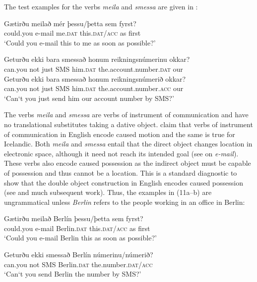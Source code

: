 \documentclass[output=paper,modfonts,nonflat,colorlinks,citecolor=brown]{langsci/langscibook}
\begin{document}
The test examples for the verbs \textit{meila} and \textit{smessa} are given in :

\ea%
    \label{ex:jonsson:10}
\ea
\gll  Gætirðu  meilað  mér  þessu/þetta  sem  fyrst?\\
   could.you  e-mail  me.\textsc{dat}  this.\textsc{dat/acc}  as  first\\
\glt `Could you e-mail this to me as soon as possible?'

\ex
\gll   Geturðu  ekki  bara  smessað  honum  reikningsnúmerinu  okkar?\\
 can.you  not  just  SMS  him.\textsc{dat}  the.account.number.\textsc{dat}  our\\


\ex
\gll   Geturðu  ekki  bara  smessað  honum  reikningsnúmerið  okkar?\\
 can.you  not  just  SMS  him.\textsc{dat}  the.account.number.\textsc{acc}  our\\
\glt `Can‘t you just send him our account number by SMS?'
\z
\z

The verbs \textit{meila} and \textit{smessa} are verbs of instrument of communication and have no translational substitutes taking a dative object.  \citet{RappaportHovavLevin2008} claim that verbs of instrument of communication in English encode caused motion and the same is true for Icelandic. Both \textit{meila} and \textit{smessa} entail that the direct object changes location in electronic space, although it need not reach its intended goal (see \citealt{Beavers2011} on \textit{e-mail}). These verbs also encode caused possession as the indirect object must be capable of possession and thus cannot be a location. This is a standard diagnostic to show that the double object construction in English encodes caused possession (see \citealt{Green1974} and much subsequent work). Thus, the examples in (11a--b) are ungrammatical unless \textit{Berlin} refers to the people working in an office in Berlin:


\ea%
    \label{ex:jonsson:11}
\ea
\gll  *Gætirðu  meilað  Berlín  þessu/þetta  sem  fyrst?\\
   could.you  e-mail  Berlin.\textsc{dat}  this.\textsc{dat/acc}  as  first\\
\glt `Could you e-mail Berlin this as soon as possible?'

\ex
\gll   *Geturðu  ekki  smessað  Berlín  númerinu/númerið?\\
 can.you  not  SMS  Berlin.\textsc{dat}  the.number.\textsc{dat/acc}\\
\glt `Can‘t you send Berlin the number by SMS?'
\z
\z
\end{document}
